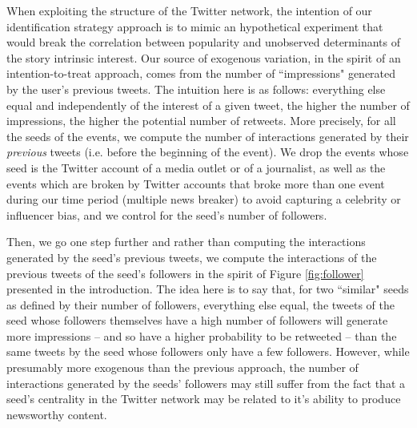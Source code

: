 When exploiting the structure of the Twitter network, the intention of our identification strategy approach is to mimic an hypothetical experiment that would break the correlation between popularity and unobserved determinants of the story intrinsic interest. Our source of exogenous variation, in the spirit of an intention-to-treat approach, comes from the number of ``impressions" generated by the user's previous tweets. The intuition here is as follows: everything else equal and independently of the interest of a given tweet, the higher the number of impressions, the higher the potential number of retweets. More precisely, for all the seeds of the events, we compute the number of interactions generated by their \textit{previous} tweets (i.e. before the beginning of the event). We drop the events whose seed is the Twitter account of a media outlet or of a journalist, as well as the events which are broken by Twitter accounts that broke more than one event during our time period (multiple news breaker) to avoid capturing a celebrity or influencer bias, and we control for the seed's number of followers.

Then, we go one step further and rather than computing the interactions generated by the seed's previous tweets, we compute the interactions of the previous tweets of the seed's followers in the spirit of Figure \ref{fig:follower} presented in the introduction. The idea here is to say that, for two ``similar" seeds as defined by their number of followers, everything else equal, the tweets of the seed whose followers themselves have a high number of followers will generate more impressions -- and so have a higher probability to be retweeted -- than the same tweets by the seed whose followers only have a few followers. However, while presumably more exogenous than the previous approach, the number of interactions generated by the seeds' followers may still suffer from the fact that a seed's centrality in the Twitter network may be related to it's ability to produce newsworthy content. 

